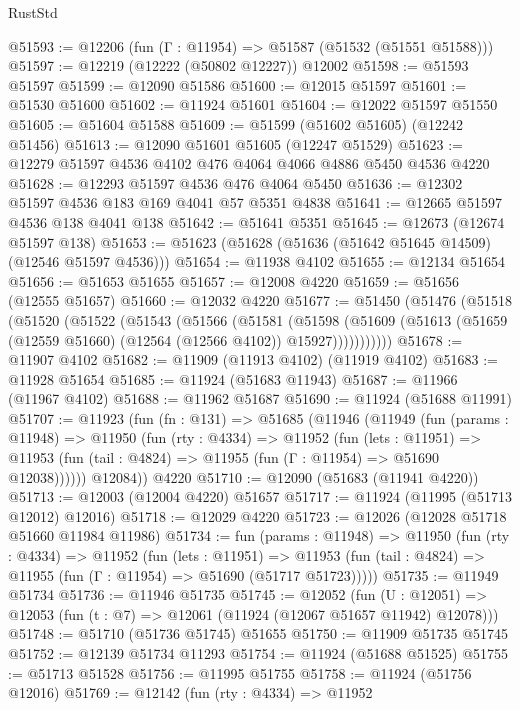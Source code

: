 \begin{lexlean}{RustStd}
\begin{coremodule}
@51593 := @12206 (fun (Γ : @11954) => @51587 (@51532 (@51551 @51588)))
@51597 := @12219 (@12222 (@50802 @12227)) @12002
@51598 := @51593 @51597
@51599 := @12090 @51586
@51600 := @12015 @51597
@51601 := @51530 @51600
@51602 := @11924 @51601
@51604 := @12022 @51597 @51550
@51605 := @51604 @51588
@51609 := @51599 (@51602 @51605) (@12242 @51456)
@51613 := @12090 @51601 @51605 (@12247 @51529)
@51623 := @12279 @51597 @4536 @4102 @476 @4064 @4066 @4886 @5450 @4536 @4220
@51628 := @12293 @51597 @4536 @476 @4064 @5450
@51636 := @12302 @51597 @4536 @183 @169 @4041 @57 @5351 @4838
@51641 := @12665 @51597 @4536 @138 @4041 @138
@51642 := @51641 @5351
@51645 := @12673 (@12674 @51597 @138)
@51653 := @51623 (@51628 (@51636 (@51642 @51645 @14509) (@12546 @51597 @4536)))
@51654 := @11938 @4102
@51655 := @12134 @51654
@51656 := @51653 @51655
@51657 := @12008 @4220
@51659 := @51656 (@12555 @51657)
@51660 := @12032 @4220
@51677 := @51450
    (@51476
      (@51518
        (@51520
          (@51522
            (@51543
              (@51566
                (@51581
                  (@51598
                    (@51609
                      (@51613 (@51659 (@12559 @51660) (@12564 (@12566 @4102)) @15927)))))))))))
@51678 := @11907 @4102
@51682 := @11909 (@11913 @4102) (@11919 @4102)
@51683 := @11928 @51654
@51685 := @11924 (@51683 @11943)
@51687 := @11966 (@11967 @4102)
@51688 := @11962 @51687
@51690 := @11924 (@51688 @11991)
@51707 := @11923
    (fun (fn : @131) =>
    @51685
      (@11946
        (@11949
          (fun (params : @11948) =>
          @11950
            (fun (rty : @4334) =>
            @11952
              (fun (lets : @11951) =>
              @11953 (fun (tail : @4824) => @11955 (fun (Γ : @11954) => @51690 @12038))))))
        @12084))
    @4220
@51710 := @12090 (@51683 (@11941 @4220))
@51713 := @12003 (@12004 @4220) @51657
@51717 := @11924 (@11995 (@51713 @12012) @12016)
@51718 := @12029 @4220
@51723 := @12026 (@12028 @51718 @51660 @11984 @11986)
@51734 := fun (params : @11948) =>
  @11950
    (fun (rty : @4334) =>
    @11952
      (fun (lets : @11951) =>
      @11953 (fun (tail : @4824) => @11955 (fun (Γ : @11954) => @51690 (@51717 @51723)))))
@51735 := @11949 @51734
@51736 := @11946 @51735
@51745 := @12052
    (fun (U : @12051) => @12053 (fun (t : @7) => @12061 (@11924 (@12067 @51657 @11942) @12078)))
@51748 := @51710 (@51736 @51745) @51655
@51750 := @11909 @51735 @51745
@51752 := @12139 @51734 @11293
@51754 := @11924 (@51688 @51525)
@51755 := @51713 @51528
@51756 := @11995 @51755
@51758 := @11924 (@51756 @12016)
@51769 := @12142
    (fun (rty : @4334) =>
    @11952

\end{coremodule}
\end{lexlean}
